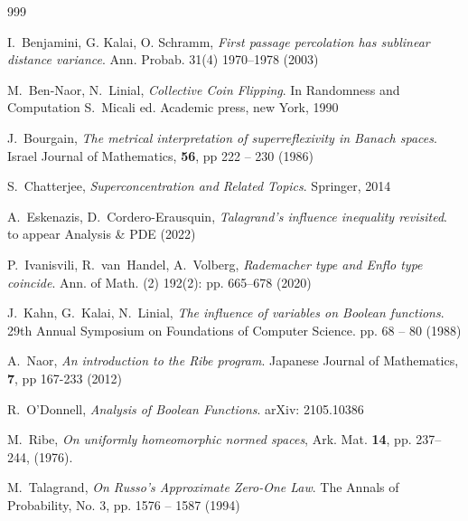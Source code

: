\begin{thebibliography}{999}



 {\sc I.~Benjamini, G. Kalai, O. Schramm}, {\em First passage percolation has sublinear distance variance}. Ann. Probab. 31(4) 1970--1978 (2003)

 {\sc M.~Ben-Naor, N.~Linial}, {\em Collective Coin Flipping}. In Randomness and Computation S.~Micali ed. Academic press, new York, 1990

 {\sc J.~Bourgain}, {\em The metrical interpretation of superreflexivity in Banach spaces}. Israel Journal of Mathematics, {\bf 56}, pp 222 -- 230 (1986)

 {\sc S.~Chatterjee}, {\em Superconcentration and Related Topics}. Springer, 2014

 {\sc A.~Eskenazis, D.~Cordero-Erausquin}, {\em Talagrand's influence inequality revisited}. to appear Analysis \& PDE (2022)

 {\sc P.~Ivanisvili, R.~van~Handel, A.~Volberg}, {\em Rademacher type and Enflo type coincide}. Ann. of Math. (2) 192(2): pp. 665--678 (2020)


 {\sc J.~Kahn, G.~Kalai,  N.~Linial}, {\em The influence of variables on Boolean functions}. 29th Annual Symposium on Foundations of Computer Science. pp. 68 -- 80 (1988)

 {\sc A.~Naor}, {\em An introduction to the Ribe program}. Japanese Journal of Mathematics, {\bf 7}, pp 167-233 (2012)

 {\sc R.~O'Donnell}, {\em Analysis of Boolean Functions}. arXiv: 2105.10386

 {\sc M.~Ribe}, {\em On uniformly homeomorphic normed spaces}, Ark. Mat. {\bf 14}, pp.  237--244, (1976).




 {\sc M.~Talagrand}, {\em On {R}usso's Approximate Zero-One Law}. The Annals of Probability, No. 3,  pp. 1576 -- 1587 (1994)








\end{thebibliography}

